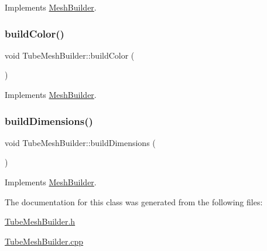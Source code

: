 Implements \mbox{\hyperlink{class_mesh_builder_a5c69dabcf61fa1e87aa8b20fe2f54fe7}{Mesh\+Builder}}.

\mbox{\label{class_tube_mesh_builder_afcdbd454d1ba0c3eed4efb5120783e08}} 
\subsubsection{\texorpdfstring{buildColor()}{buildColor()}}
{\footnotesize\ttfamily void Tube\+Mesh\+Builder\+::build\+Color (\begin{DoxyParamCaption}{ }\end{DoxyParamCaption})\hspace{0.3cm}{\ttfamily [virtual]}}



Implements \mbox{\hyperlink{class_mesh_builder_a205a6daf8b50d88eebe1df434b7bf0c4}{Mesh\+Builder}}.

\mbox{\label{class_tube_mesh_builder_a16c5008efeefa80378f86b2a8e116af4}} 
\subsubsection{\texorpdfstring{buildDimensions()}{buildDimensions()}}
{\footnotesize\ttfamily void Tube\+Mesh\+Builder\+::build\+Dimensions (\begin{DoxyParamCaption}{ }\end{DoxyParamCaption})\hspace{0.3cm}{\ttfamily [virtual]}}



Implements \mbox{\hyperlink{class_mesh_builder_af715a8510c99c7925bd8e6f0b6b182d7}{Mesh\+Builder}}.



The documentation for this class was generated from the following files\+:\begin{DoxyCompactItemize}
\item 
\mbox{\hyperlink{_tube_mesh_builder_8h}{Tube\+Mesh\+Builder.\+h}}\item 
\mbox{\hyperlink{_tube_mesh_builder_8cpp}{Tube\+Mesh\+Builder.\+cpp}}\end{DoxyCompactItemize}
